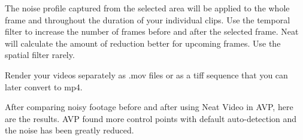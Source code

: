 \begin{fullwidth}
The noise profile captured from the selected area will be applied to the whole frame and throughout the duration of your individual clips. Use the temporal filter to increase the number of frames before and after the selected frame. Neat will calculate the amount of reduction better for upcoming frames. Use the spatial filter rarely.


Render your videos separately as .mov files or as a tiff sequence that you can later convert to mp4. 

After comparing noisy footage before and after using Neat Video in AVP, here are the results. AVP found more control points with default auto-detection and the noise has been greatly reduced.



\clearpage
\end{fullwidth}